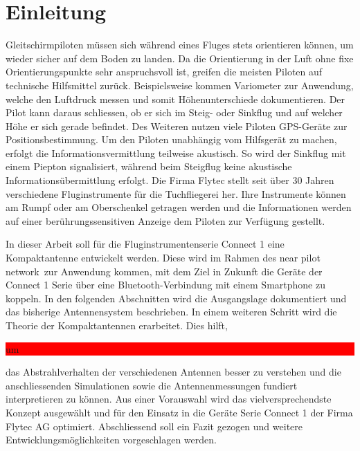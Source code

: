 \newpage
\section{Einleitung}
Gleitschirmpiloten müssen sich während eines Fluges stets orientieren können, um wieder sicher auf dem Boden zu landen. Da die Orientierung in der Luft ohne fixe Orientierungspunkte sehr anspruchsvoll ist, greifen die meisten Piloten auf technische Hilfsmittel zurück. Beispielsweise kommen Variometer zur Anwendung, welche den Luftdruck messen und somit Höhenunterschiede dokumentieren. Der Pilot kann daraus schliessen, ob er sich im Steig- oder Sinkflug  und auf welcher Höhe er sich gerade befindet. Des Weiteren nutzen viele Piloten GPS-Geräte zur Positionsbestimmung. Um den Piloten unabhängig vom Hilfsgerät zu machen, erfolgt die Informationsvermittlung teilweise akustisch. So wird der Sinkflug  mit einem Piepton signalisiert, während beim Steigflug keine akustische Informationsübermittlung erfolgt. Die Firma Flytec stellt seit über 30 Jahren verschiedene Fluginstrumente für die Tuchfliegerei her. Ihre Instrumente können am Rumpf oder am Oberschenkel getragen werden und die Informationen werden auf einer berührungssensitiven Anzeige dem Piloten zur Verfügung gestellt. 

In dieser Arbeit soll für die Fluginstrumentenserie \glqq Connect 1 \grqq eine Kompaktantenne entwickelt werden. Diese wird im Rahmen des \glqq near pilot network\grqq \ zur Anwendung kommen, mit dem Ziel in Zukunft die Geräte der \glqq Connect 1 \grqq Serie über eine Bluetooth-Verbindung mit einem Smartphone zu koppeln. In den folgenden Abschnitten wird die Ausgangslage dokumentiert und das bisherige Antennensystem beschrieben. In einem weiteren Schritt wird die Theorie der Kompaktantennen erarbeitet. Dies hilft,\colorbox{red}{\parbox[t]{\textwidth}{um}} das Abstrahlverhalten der verschiedenen Antennen besser zu verstehen und die anschliessenden Simulationen sowie die Antennenmessungen fundiert interpretieren zu können. Aus einer Vorauswahl wird das vielversprechendste Konzept ausgewählt und für den Einsatz in die Geräte Serie \glqq Connect 1 \grqq der Firma Flytec AG optimiert. Abschliessend soll ein Fazit gezogen und weitere Entwicklungsmöglichkeiten vorgeschlagen werden.


